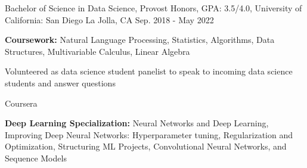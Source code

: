 
\begin{cventries}
  \cventry
    {Bachelor of Science in Data Science, Provost Honors, GPA: 3.5/4.0,} %
    {University of California: San Diego} %
    {La Jolla, CA} %
    {Sep. 2018 - May 2022} %
    {
      \begin{cvitems} %
         \item {\textbf{Coursework:} {Natural Language Processing, Statistics, Algorithms, Data Structures, Multivariable Calculus, Linear Algebra}}
         \item{Volunteered as data science student panelist to speak to incoming data science students and answer questions}
      \end{cvitems}
    }
  \cventry
    {} %
    {Coursera} %
    {} %
    {} %
    {
      \begin{cvitems} %
         \item {\textbf{Deep Learning Specialization:} {Neural Networks and Deep Learning, Improving Deep Neural Networks: Hyperparameter tuning, Regularization and Optimization, Structuring ML Projects, Convolutional Neural Networks, and Sequence Models}}
      \end{cvitems}
    }
\end{cventries}
